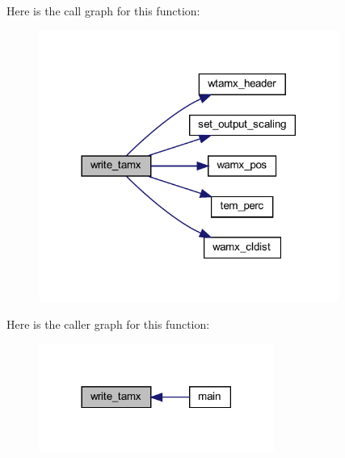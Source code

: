 Here is the call graph for this function\+:
\nopagebreak
\begin{figure}[H]
\begin{center}
\leavevmode
\includegraphics[width=278pt]{Marco_8f90_a19af5e29ee475d2389b569fea2f1a91d_cgraph}
\end{center}
\end{figure}
Here is the caller graph for this function\+:
\nopagebreak
\begin{figure}[H]
\begin{center}
\leavevmode
\includegraphics[width=218pt]{Marco_8f90_a19af5e29ee475d2389b569fea2f1a91d_icgraph}
\end{center}
\end{figure}
\mbox{\label{Marco_8f90_aad827ba2d87a213e0eb9ce15bedec51f}} 
